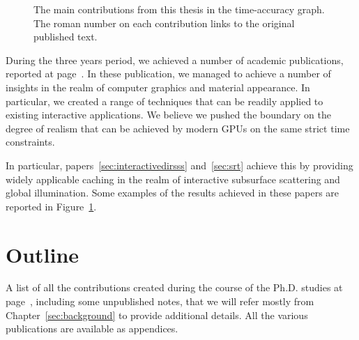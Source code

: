 \begin{figure}
\caption{The main contributions from this thesis in the time-accuracy graph. The roman number on each contribution links to the original published text.} 
\label{fig:main_results}
\end{figure}

During the three years period, we achieved a number of academic publications, reported at page~\pageref{sec:contributionlist}. In these publication, we managed to achieve a number of insights in the realm of computer graphics and material appearance. In particular, we created a range of techniques that can be readily applied to existing interactive applications. We believe we pushed the boundary on the degree of realism that can be achieved by modern GPUs on the same strict time constraints. 

In particular, papers~\ref{sec:interactivedirsss} and~\ref{sec:srt} achieve this by providing widely applicable caching in the realm of interactive subsurface scattering and global illumination. Some examples of the results achieved in these papers are reported in Figure~\ref{fig:main_results}.

\section{Outline}

A list of all the contributions created during the course of the Ph.D. studies at page~\pageref{sec:contributionlist}, including some unpublished notes, that we will refer mostly from Chapter~\ref{sec:background} to provide additional details. All the various publications are available as appendices. 

